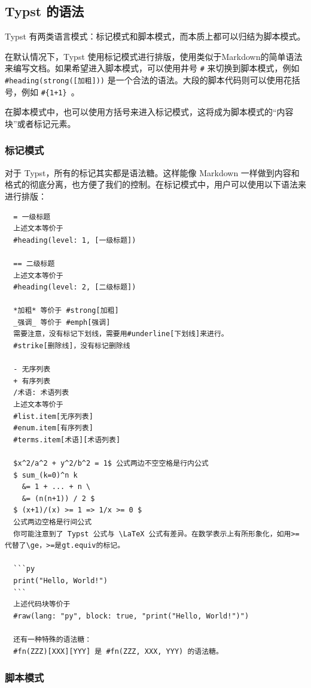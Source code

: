 \subsection{Typst 的语法}

Typst 有两类语言模式：标记模式和脚本模式，而本质上都可以归结为脚本模式。

在默认情况下，Typst 使用标记模式进行排版，使用类似于Markdown的简单语法来编写文档。如果希望进入脚本模式，可以使用井号 \texttt{\#}  来切换到脚本模式，例如 \texttt{\#heading(strong([加粗]))} 是一个合法的语法。大段的脚本代码则可以使用花括号，例如 \texttt{\#\{1+1\} }。

在脚本模式中，也可以使用方括号来进入标记模式，这将成为脚本模式的“内容块”或者标记元素。

\subsubsection{标记模式}

对于 Typst，所有的标记其实都是语法糖。这样能像 Markdown 一样做到内容和格式的彻底分离，也方便了我们的控制。在标记模式中，用户可以使用以下语法来进行排版：

\begin{verbatim}
  = 一级标题
  上述文本等价于
  #heading(level: 1, [一级标题])

  == 二级标题
  上述文本等价于
  #heading(level: 2, [二级标题])

  *加粗* 等价于 #strong[加粗]
  _强调_ 等价于 #emph[强调]
  需要注意，没有标记下划线，需要用#underline[下划线]来进行。
  #strike[删除线]，没有标记删除线

  - 无序列表
  + 有序列表
  /术语: 术语列表
  上述文本等价于
  #list.item[无序列表]
  #enum.item[有序列表]
  #terms.item[术语][术语列表]

  $x^2/a^2 + y^2/b^2 = 1$ 公式两边不空空格是行内公式
  $ sum_(k=0)^n k
    &= 1 + ... + n \
    &= (n(n+1)) / 2 $
  $ (x+1)/(x) >= 1 => 1/x >= 0 $
  公式两边空格是行间公式
  你可能注意到了 Typst 公式与 \LaTeX 公式有差异。在数学表示上有所形象化，如用>=代替了\ge，>=是gt.equiv的标记。

  ```py
  print("Hello, World!")
  ```
  上述代码块等价于
  #raw(lang: "py", block: true, "print("Hello, World!")")

  还有一种特殊的语法糖：
  #fn(ZZZ)[XXX][YYY] 是 #fn(ZZZ, XXX, YYY) 的语法糖。
\end{verbatim}

\subsubsection{脚本模式}

